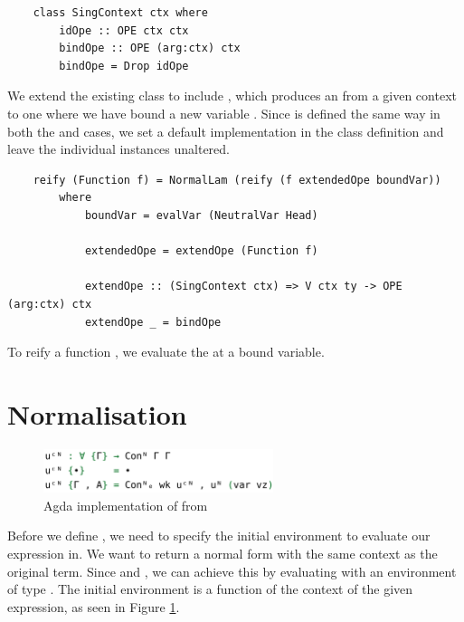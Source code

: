 
\begin{lstlisting}
    class SingContext ctx where
        idOpe :: OPE ctx ctx
        bindOpe :: OPE (arg:ctx) ctx
        bindOpe = Drop idOpe
\end{lstlisting}

We extend the existing class  to include , which produces an  from a given context  to one where we have bound a new variable . Since  is defined the same way in both the  and \code{(:)} cases, we set a default implementation in the class definition and leave the individual instances unaltered. 

\begin{lstlisting}
    reify (Function f) = NormalLam (reify (f extendedOpe boundVar)) 
        where
            boundVar = evalVar (NeutralVar Head)

            extendedOpe = extendOpe (Function f)

            extendOpe :: (SingContext ctx) => V ctx ty -> OPE (arg:ctx) ctx
            extendOpe _ = bindOpe 
\end{lstlisting}

To reify a function , we evaluate the  at a bound variable. 



\section{Normalisation}

\begin{figure}[h]
    \centering
    \includegraphics[width=0.6\textwidth]{./images/agda_initial_env.png}
    \caption{Agda implementation of  from \cite{AgdaNbe}}
    \label{fig:agdaInitialEnv}
\end{figure}

Before we define , we need to specify the initial environment to evaluate our expression in. We want  to return a normal form with the same context as the original term. Since  and , we can achieve this by evaluating with an environment of type . The initial environment is a function of the context of the given expression, as seen in Figure \ref{fig:agdaInitialEnv}.

